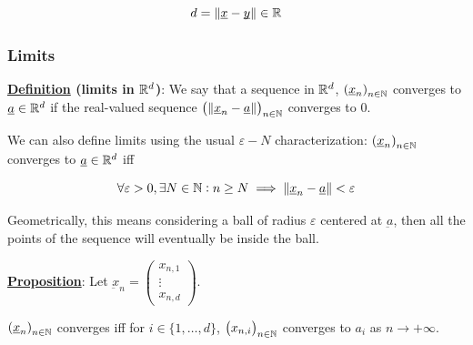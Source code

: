 \documentclass[10pt]{extarticle}
\renewcommand{\vec}[1]{\underbar{\ensuremath{#1}}}
\begin{document}
$$
    d = \norm{\vec{x} - \vec{y}} \in \R
$$

\subsubsection{Limits}

\textbf{\underline{Definition} (limits in $\mathbb{R}^d$)}:
We say that a sequence in $\mathbb{R}^d$, $\left(\vec{x}_n\right)_{n \in \N}$ converges to $\vec{a} \in \R^d$ if the real-valued sequence $\left(\norm{\vec{x}_n - \vec{a}}\right)_{n \in \N}$ converges to 0.

We can also define limits using the usual $\varepsilon - N$ characterization: $\left(\vec{x}_n\right)_{n \in \N}$ converges to $\vec{a} \in \R^d$ iff

$$
    \forall \varepsilon > 0, \exists N \in \N : n \geq N \implies \norm{\vec{x}_n - \vec{a}} < \varepsilon
$$

Geometrically, this means considering a ball of radius $\varepsilon$ centered at $\vec{a}$, then all the points of the sequence will eventually be inside the ball.

\textbf{\underline{Proposition}}:
Let $\vec{x}_n = \begin{pmatrix}
        x_{n,1} \\ \vdots \\ x_{n,d}
    \end{pmatrix}$.

$\left(\vec{x}_n\right)_{n \in \N}$ converges iff for $i \in \{1, \ldots, d\}$, $\left(x_{n,i}\right)_{n \in \mathbb{N}}$ converges to $a_i$ as $n \to +\infty$.
\end{document}
